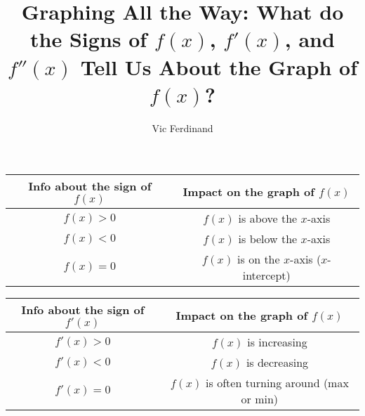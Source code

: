 \documentclass{ximera}
\author{Vic Ferdinand}
\title{Graphing All the Way: What do the Signs of $f(x)$, $f'(x)$, and $f''(x)$ Tell Us About the Graph of $f(x)$?}
\begin{document}
\begin{abstract}
\end{abstract}
\maketitle

\begin{exploration}
\begin{center}
    \begin{tabular}{|c|c|} \hline
        Info about the sign of $f(x)$ & Impact on the graph of $f(x)$  \\ \hline
        $f(x) > 0$ & $f(x)$ is above the $x$-axis \\ \hline
        $f(x) < 0$ & $f(x)$ is below the $x$-axis \\ \hline
        $f(x) = 0$ & $f(x)$ is on the $x$-axis ($x$-intercept) \\ \hline
    \end{tabular}
\end{center}
\end{exploration}

\begin{exploration}
\begin{center}
    \begin{tabular}{|c|c|} \hline
        Info about the sign of $f'(x)$ & Impact on the graph of $f(x)$  \\ \hline
        $f'(x) > 0$ & $f(x)$ is increasing \\ \hline
        $f'(x) < 0$ & $f(x)$ is decreasing \\ \hline
        $f'(x) = 0$ & $f(x)$ is often turning around (max or min) \\ \hline
    \end{tabular}
\end{center}
\end{exploration}
\end{document}
